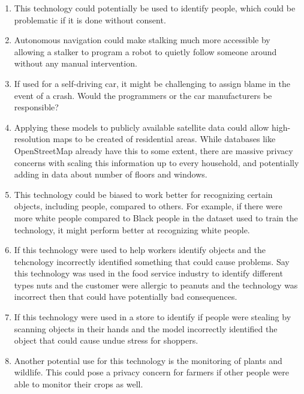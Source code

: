 \begin{enumerate}
    \item This technology could potentially be used to identify people, which could be problematic if it is done without consent.
    \item Autonomous navigation could make stalking much more accessible by allowing a stalker to program a robot to quietly follow someone around without any manual intervention.
    \item If used for a self-driving car, it might be challenging to assign blame in the event of a crash. Would the programmers or the car manufacturers be responsible?
    \item Applying these models to publicly available satellite data could allow high-resolution maps to be created of residential areas. While databases like OpenStreetMap already have this to some extent, there are massive privacy concerns with scaling this information up to every household, and potentially adding in data about number of floors and windows.
    \item This technology could be biased to work better for recognizing certain objects, including people, compared to others. For example, if there were more white people compared to Black people in the dataset used to train the technology, it might perform better at recognizing white people.
    \item If this technology were used to help workers identify objects and the tehcnology incorrectly identified something that could cause problems. Say this technology was used in the food service industry to identify different types nuts and the customer were allergic to peanuts and the technology was incorrect then that could have potentially bad consequences.
    \item If this technology were used in a store to identify if people were stealing by scanning objects in their hands and the model incorrectly identified the object that could cause undue stress for shoppers.
    \item Another potential use for this technology is the monitoring of plants and wildlife. This could pose a privacy concern for farmers if other people were able to monitor their crops as well.
\end{enumerate}


